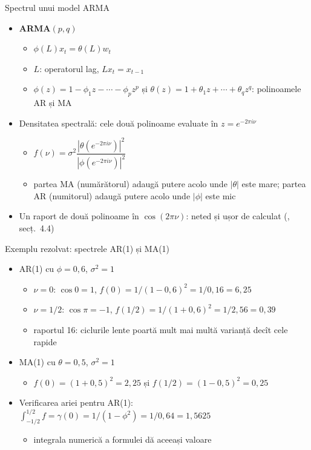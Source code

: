 \begin{frame}{Spectrul unui model ARMA}
\itemsize{\small}
\begin{itemize}
    \item \textbf{ARMA}$(p,q)$
    \begin{itemize}
        \item $\phi(L)x_t = \theta(L)w_t$
        \item $L$: operatorul lag, $Lx_t = x_{t-1}$
        \item $\phi(z) = 1 - \phi_1 z - \cdots - \phi_p z^p$ și $\theta(z) = 1 + \theta_1 z + \cdots + \theta_q z^q$: polinoamele AR și MA
    \end{itemize}
    \item Densitatea spectrală: cele două polinoame evaluate în $z = e^{-2\pi i\nu}$
    \begin{itemize}
        \item $f(\nu) = \sigma^2\dfrac{|\theta(e^{-2\pi i\nu})|^2}{|\phi(e^{-2\pi i\nu})|^2}$
        \item partea MA (numărătorul) adaugă putere acolo unde $|\theta|$ este mare; partea AR (numitorul) adaugă putere acolo unde $|\phi|$ este mic
    \end{itemize}
    \item Un raport de două polinoame în $\cos(2\pi\nu)$: neted și ușor de calculat (, secț.~4.4)
\end{itemize}
\end{frame}

\begin{frame}{Exemplu rezolvat: spectrele AR(1) și MA(1)}
\itemsize{\small}
\begin{itemize}
    \item AR(1) cu $\phi = 0{,}6$, $\sigma^2 = 1$
    \begin{itemize}
        \item $\nu = 0$: $\cos 0 = 1$, $f(0) = 1/(1 - 0{,}6)^2 = 1/0{,}16 = 6{,}25$
        \item $\nu = 1/2$: $\cos\pi = -1$, $f(1/2) = 1/(1 + 0{,}6)^2 = 1/2{,}56 = 0{,}39$
        \item raportul 16: ciclurile lente poartă mult mai multă varianță decît cele rapide
    \end{itemize}
    \item MA(1) cu $\theta = 0{,}5$, $\sigma^2 = 1$
    \begin{itemize}
        \item $f(0) = (1 + 0{,}5)^2 = 2{,}25$ și $f(1/2) = (1 - 0{,}5)^2 = 0{,}25$
    \end{itemize}
    \item Verificarea ariei pentru AR(1): $\int_{-1/2}^{1/2} f = \gamma(0) = 1/(1 - \phi^2) = 1/0{,}64 = 1{,}5625$
    \begin{itemize}
        \item integrala numerică a formulei dă aceeași valoare
    \end{itemize}
\end{itemize}
\end{frame}

